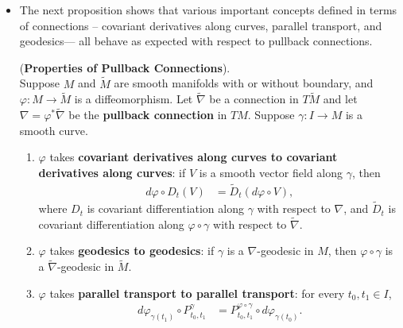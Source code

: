 \documentclass[11pt]{article}
\begin{document}
\begin{itemize}
\item The next proposition shows that various important concepts defined in terms of connections -- covariant derivatives along curves, parallel transport, and geodesics—
all behave as expected with respect to pullback connections.
\begin{proposition} (\textbf{Properties of Pullback Connections}).\\
Suppose $M$ and $\widetilde{M}$ are smooth manifolds with or without boundary, and $\varphi: M \rightarrow \widetilde{M}$ is a diffeomorphism.
Let $\widetilde{\nabla}$  be a connection in $T\widetilde{M}$ and let $\nabla = \varphi^{*}\widetilde{\nabla}$ be the \textbf{pullback connection} in $TM$.
Suppose $\gamma: I \rightarrow M$  is a smooth curve.
\begin{enumerate}
\item $\varphi$ takes \textbf{covariant derivatives along curves to covariant derivatives along curves}: if $V$ is a smooth vector field along $\gamma$, then
\begin{align*}
d\varphi \circ D_t(V) &= \widetilde{D}_t(d\varphi \circ V),
\end{align*}
where $D_t$ is covariant differentiation along $\gamma$ with respect to $\nabla$, and $\widetilde{D}_t$ is
covariant differentiation along $\varphi \circ \gamma$ with respect to $\widetilde{\nabla}$.
\item $\varphi$ takes \textbf{geodesics to geodesics}: if $\gamma$ is a $\nabla$-geodesic in $M$, then $\varphi \circ \gamma$ is a
$\widetilde{\nabla}$-geodesic in $\widetilde{M}$.
\item $\varphi$ takes \textbf{parallel transport to parallel transport}: for every $t_0, t_1 \in I$,
\begin{align*}
d\varphi_{\gamma(t_1)} \circ P^{\gamma}_{t_0, t_1} &= P^{\varphi \circ \gamma}_{t_0, t_1} \circ d\varphi_{\gamma(t_0)}.
\end{align*}

\end{enumerate}
\end{proposition}
\end{itemize}

\newpage


\end{document}
